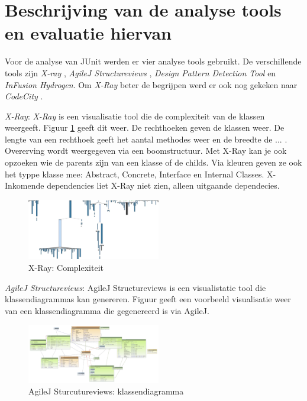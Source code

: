 \documentclass[a4paper, 11pt]{article}
\begin{document}
\section{Beschrijving van de analyse tools en evaluatie hiervan}

Voor de analyse van JUnit werden er vier analyse tools gebruikt. De verschillende tools zijn \emph{X-ray} \cite{X-Ray}, \emph{AgileJ Structureviews} \cite{AgileJ Structureviews} , \emph{Design Pattern Detection Tool} \cite{Design Pattern Detection Tool} en \emph{InFusion Hydrogen}. Om \emph{X-Ray} beter de begrijpen werd er ook nog gekeken naar \emph{CodeCity} \cite{CodeCity}.

\begin{description}

\item \emph{X-Ray}: \emph{X-Ray} is een visualisatie tool die de complexiteit van de klassen weergeeft. Figuur \ref{fig:X-Ray} geeft dit weer. De rechthoeken geven de klassen weer. De lengte van een rechthoek geeft het aantal methodes weer en de breedte de  ... . Overerving wordt weergegeven via een boomstructuur. Met X-Ray kan je ook opzoeken wie de parents zijn van een klasse of de childs. Via kleuren geven ze ook het typpe klasse mee: Abstract, Concrete, Interface en Internal Classes. X-Inkomende dependencies liet X-Ray niet zien, alleen uitgaande dependecies.   

\begin{figure}[hb!]
	\centering
	\includegraphics[width=0.52\textwidth]{XRayComplexity}
	\caption{X-Ray: Complexiteit}
	\label{fig:X-Ray}
\end{figure}

\item \emph{AgileJ Structureviews}: AgileJ Structureviews is een visualistatie tool die klassendiagrammas kan genereren. Figuur \label{fig:AgileJklassendia} geeft een voorbeeld visualisatie weer van een klassendiagramma die gegenereerd is via AgileJ.


\begin{figure}[hb!]
	\centering
	\includegraphics[width=0.52\textwidth]{AgileJKlassendiagramma}
	\caption{AgileJ Sturcutureviews: klassendiagramma}
	\label{fig:AgileJKlassendia}
\end{figure}


\end{description}
\end{document}
